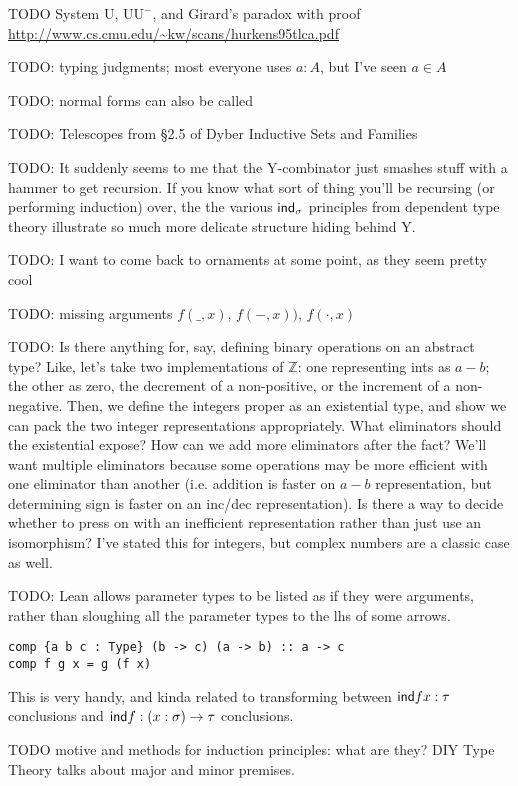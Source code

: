 \documentclass[11pt]{article} %
\theoremstyle{definition}
\theoremstyle{remark}
\begin{document}
TODO System U, U$\mathrm U^-$, and Girard's paradox with proof \url{http://www.cs.cmu.edu/~kw/scans/hurkens95tlca.pdf}

TODO: typing judgments; most everyone uses $a : A$, but I've seen $a \in A$\cite{diy_1989}

TODO: normal forms can also be called \cite{martin-lof_1984}

TODO:
Telescopes from \S2.5 of Dyber Inductive Sets and Families

TODO:
It suddenly seems to me that the Y-combinator just smashes stuff with a hammer to get recursion.
If you know what sort of thing you'll be recursing (or performing induction) over, the the various $\mathsf{ind}_\sigma$ principles from dependent type theory illustrate so much more delicate structure hiding behind Y.

TODO: I want to come back to ornaments at some point, as they seem pretty cool

TODO: missing arguments $f(\_,x)$, $f(-,x))$, $f(\cdot, x)$

TODO:
Is there anything for, say, defining binary operations on an abstract type?
Like, let's take two implementations of $\mathbb Z$: one representing ints as $a - b$; the other as zero, the decrement of a non-positive, or the increment of a non-negative.
Then, we define the integers proper as an existential type, and show we can pack the two integer representations appropriately.
What eliminators should the existential expose?
How can we add more eliminators after the fact?
We'll want multiple eliminators because some operations may be more efficient with one eliminator than another (i.e. addition is faster on $a - b$ representation, but determining sign is faster on an inc/dec representation).
Is there a way to decide whether to press on with an inefficient representation rather than just use an isomorphism?
I've stated this for integers, but complex numbers are a classic case as well.


TODO: Lean allows parameter types to be listed as if they were arguments, rather than sloughing all the parameter types to the lhs of some arrows.
\begin{verbatim}
comp {a b c : Type} (b -> c) (a -> b) :: a -> c
comp f g x = g (f x)
\end{verbatim}
This is very handy, and kinda related to transforming between $\mathsf{ind} f x : \tau$ conclusions and $\mathsf{ind} f : (x:\sigma) \to \tau$ conclusions.

TODO motive and methods for induction principles: what are they? DIY Type Theory talks about major and minor premises.
\end{document}
